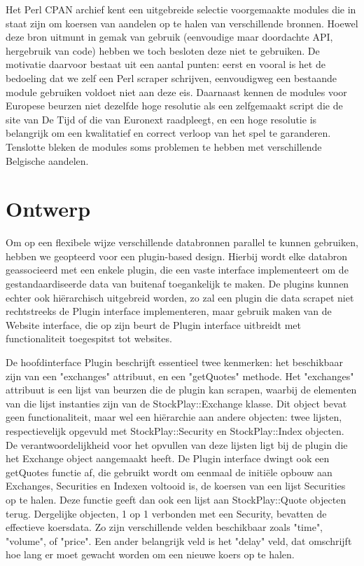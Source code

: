 Het Perl CPAN archief kent een uitgebreide selectie voorgemaakte modules die in staat zijn om koersen van aandelen op te halen van verschillende bronnen. Hoewel deze bron uitmunt in gemak van gebruik (eenvoudige maar doordachte API, hergebruik van code) hebben we toch besloten deze niet te gebruiken. De motivatie daarvoor bestaat uit een aantal punten: eerst en vooral is het de bedoeling dat we zelf een Perl scraper schrijven, eenvoudigweg een bestaande module gebruiken voldoet niet aan deze eis. Daarnaast kennen de modules voor Europese beurzen niet dezelfde hoge resolutie als een zelfgemaakt script die de site van De Tijd of die van Euronext raadpleegt, en een hoge resolutie is belangrijk om een kwalitatief en correct verloop van het spel te garanderen. Tenslotte bleken de modules soms problemen te hebben met verschillende Belgische aandelen.

\section{Ontwerp}

Om op een flexibele wijze verschillende databronnen parallel te kunnen gebruiken, hebben we geopteerd voor een plugin-based design. Hierbij wordt elke databron geassocieerd met een enkele plugin, die een vaste interface implementeert om de gestandaardiseerde data van buitenaf toegankelijk te maken. De plugins kunnen echter ook hi\"erarchisch uitgebreid worden, zo zal een plugin die data scrapet niet rechtstreeks de Plugin interface implementeren, maar gebruik maken van de Website interface, die op zijn beurt de Plugin interface uitbreidt met functionaliteit toegespitst tot websites.

De hoofdinterface Plugin beschrijft essentieel twee kenmerken: het beschikbaar zijn van een "exchanges" attribuut, en een "getQuotes" methode. Het "exchanges" attribuut is een lijst van beurzen die de plugin kan scrapen, waarbij de elementen van die lijst instanties zijn van de StockPlay::Exchange klasse. Dit object bevat geen functionaliteit, maar wel een hi\"erarchie aan andere objecten: twee lijsten, respectievelijk opgevuld met StockPlay::Security en StockPlay::Index objecten. De verantwoordelijkheid voor het opvullen van deze lijsten ligt bij de plugin die het Exchange object aangemaakt heeft.
De Plugin interface dwingt ook een getQuotes functie af, die gebruikt wordt om eenmaal de initi\"ele opbouw aan Exchanges, Securities en Indexen voltooid is, de koersen van een lijst Securities op te halen. Deze functie geeft dan ook een lijst aan StockPlay::Quote objecten terug. Dergelijke objecten, 1 op 1 verbonden met een Security, bevatten de effectieve koersdata. Zo zijn verschillende velden beschikbaar zoals "time", "volume", of "price". Een ander belangrijk veld is het "delay" veld, dat omschrijft hoe lang er moet gewacht worden om een nieuwe koers op te halen.

